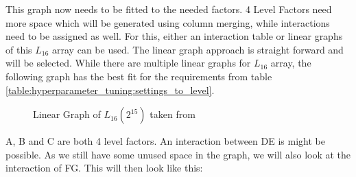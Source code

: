 This graph now needs to be fitted to the needed factors. 4 Level Factors need more space which will be generated using column merging, while interactions need to be assigned as well.
For this, either an interaction table or linear graphs of this $L_{16}$ array can be used. The linear graph approach is straight forward and will be selected. While there are multiple linear graphs for $L_{16}$ array, the following graph has the best fit for the requirements from table \ref{table:hyperparameter_tuning:settings_to_level}.

\begin{figure}[H]
	\centering
{}
\caption{ Linear Graph of $L_{16}(2^{15})$ taken from \cite{yang_design_2009}}
\end{figure}



A, B and C are both 4 level factors. An interaction between DE is might be possible. As we still have some unused space in the graph, we will also look at the interaction of FG. This will then look like this:


